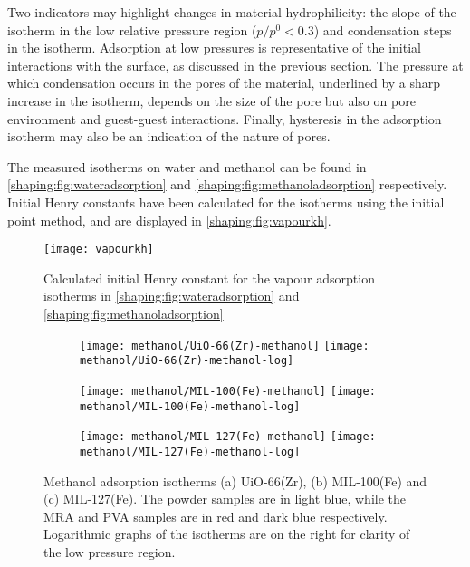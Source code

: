 Two indicators may highlight changes in material hydrophilicity: 
the slope of the isotherm in the low relative pressure region 
(\(p/p^0 < 0.3\)) and condensation steps in the isotherm. 
Adsorption at low pressures is representative of the initial
interactions with the surface, as discussed in the previous section.
The pressure at which condensation occurs in the pores of the material, 
underlined by a sharp increase in the isotherm, depends on the 
size of the pore but also on pore environment and 
guest-guest interactions. Finally, hysteresis in the adsorption 
isotherm may also be an indication of the nature of pores.

The measured isotherms on water and methanol can be found
in \autoref{shaping:fig:wateradsorption} 
and \autoref{shaping:fig:methanoladsorption} respectively.
Initial Henry constants have been calculated for the isotherms
using the initial point method, and are displayed in
\autoref{shaping:fig:vapourkh}.

\begin{figure}[htb]
    \centering
    \texttt{[image: vapourkh]}%
    \caption{Calculated initial Henry constant for
    the vapour adsorption isotherms 
    in \autoref{shaping:fig:wateradsorption}
    and \autoref{shaping:fig:methanoladsorption}}%
    \label{shaping:fig:vapourkh}
\end{figure}

\begin{figure}[p!]
    \centering

    \begin{subfigure}{\linewidth}
        \centering
        \texttt{[image: methanol/UiO-66(Zr)-methanol]}%
        \texttt{[image: methanol/UiO-66(Zr)-methanol-log]}%
        \caption{}\label{shaping:fig:methanoluio66}%
    \end{subfigure}%

    \begin{subfigure}{\linewidth}
        \centering
        \texttt{[image: methanol/MIL-100(Fe)-methanol]}%
        \texttt{[image: methanol/MIL-100(Fe)-methanol-log]}%
        \caption{}\label{shaping:fig:methanolmil100}%
    \end{subfigure}%

    \begin{subfigure}{\linewidth}
        \centering
        \texttt{[image: methanol/MIL-127(Fe)-methanol]}%
        \texttt{[image: methanol/MIL-127(Fe)-methanol-log]}%
        \caption{}\label{shaping:fig:methanolmil127}%
    \end{subfigure}%
    
    \caption{Methanol adsorption isotherms (a) UiO-66(Zr), 
    (b) MIL-100(Fe) and (c) MIL-127(Fe). The powder samples are in light
    blue, while the \gls{MRA} and \gls{PVA} samples are in red
    and dark blue respectively. Logarithmic 
    graphs of the isotherms are on the right for clarity of the low
    pressure region.}%
    \label{shaping:fig:methanoladsorption}
\end{figure}

